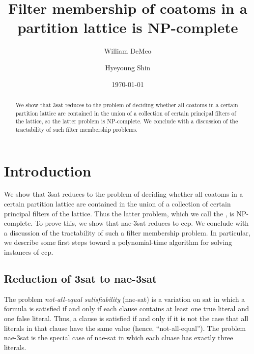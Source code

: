 \documentclass[12pt]{amsart}
\numberwithin{equation}{section}
\theoremstyle{plain}
\theoremstyle{definition}
\newcommand{\ccp}{\acs{ccp}\xspace}
\newcommand{\sat}{\acs{sat}\xspace}
\newcommand{\nae}{\acs{nae}\xspace}
\newcommand{\NP}{\acs{NP}\xspace}
\begin{document}
\title[NP-completeness of coatom counting]{Filter membership of coatoms
  in a\\ partition lattice is NP-complete}
\date{\today}
\author[W.~DeMeo]{William DeMeo}
\address{University of Hawaii}

\author[H.~Shin]{Hyeyoung Shin}
\address{University of Hawaii}


\maketitle

\begin{abstract}
We show that 3\sat %
reduces to the problem of deciding whether all coatoms in a certain partition
lattice are contained in the union of a collection of certain principal filters
of the lattice, so the latter problem is \NP-complete.
We conclude with a discussion of the tractability of
such filter membership problems.
\end{abstract}

\section{Introduction}
\label{sec:introduction}
We show that 3\sat %
reduces to the problem of deciding whether all coatoms in a certain partition
lattice are contained in the union of a collection of certain principal filters
of the lattice. Thus the latter problem, which we call the
, is \NP-complete.
To prove this, we show that \nae-3\sat reduces to \ccp.
We conclude with a discussion of the tractability of
such a filter membership problem. In particular, we describe some first steps
toward a polynomial-time algorithm for solving instances of \ccp.

\subsection{Reduction of 3\sat to \nae-3\sat}
The problem \emph{not-all-equal satisfiability} (\nae-\sat) is a variation on \sat in which
a formula is satisfied if and only if each clause contains at least one true
literal and one false literal.  Thus, a clause is satisfied if and only
if it is not the case that all literals in that clause have the same value
(hence, ``not-all-equal'').
The problem \nae-3\sat is the special case of \nae-\sat in which each cluase has exactly
three literals.
\end{document}
